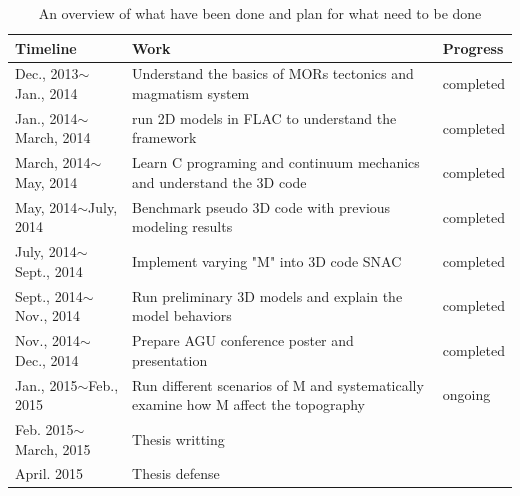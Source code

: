 \documentclass[12pt]{article}
\begin{document}
\begin{table}[hc]
\begin{small}
\begin{center}
\begin{tabular}{|l|p{7cm}|l|}
\hline
Timeline & Work & Progress\\
\hline
Dec., 2013$\sim$Jan., 2014& Understand the basics of MORs tectonics and magmatism system & completed\\ \hline
Jan., 2014$\sim$March, 2014& run 2D models in FLAC to understand the framework& completed\\ \hline
March, 2014$\sim$May, 2014& Learn C programing and continuum mechanics and understand the 3D code& completed\\ \hline
May, 2014$\sim$July, 2014& Benchmark pseudo 3D code with previous modeling results& completed\\ \hline
July, 2014$\sim$Sept., 2014& Implement varying "M" into 3D code SNAC& completed\\ \hline
Sept., 2014$\sim$Nov., 2014& Run preliminary 3D models and explain the model behaviors& completed\\ \hline
Nov., 2014$\sim$Dec., 2014& Prepare AGU conference poster and presentation& completed\\ \hline

Jan., 2015$\sim$Feb., 2015  & Run different scenarios of M and systematically examine how M affect the topography & ongoing\\ \hline
Feb. 2015$\sim$March, 2015 & Thesis writting & \\ \hline
April. 2015 & Thesis defense & \\ \hline
\end{tabular}
\end{center}
\end{small}
\caption{An overview of what have been done and plan for what need to be done}
\label{tab:plan}
\end{table}



\break
\begin{footnotesize}




\end{footnotesize}
\end{document}
